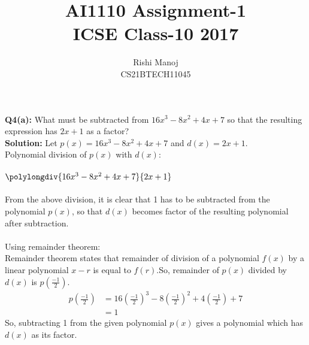 \documentclass[journal,12pt,twocolumn]{IEEEtran}
\title{AI1110 Assignment-1\\ICSE Class-10 2017}
\author{Rishi Manoj\\CS21BTECH11045}
\begin{document}
\maketitle

\providecommand{\brak}[1]{\ensuremath{\left(#1\right)}}

\textbf{Q4(a):}
What must be subtracted from $16x^3-8x^2+4x+7$ so that the resulting expression has $2x+1$ as a factor?\\
\textbf{Solution:}
Let $p(x)=16x^3-8x^2+4x+7$ and $d(x)=2x+1$.\\
Polynomial division of $p(x)$ with $d(x)$:\\
\\
$\polylongdiv{16x^3-8x^2+4x+7}{2x+1}$
\\
\\
From the above division, it is clear that 1 has to be subtracted from the polynomial $p(x)$, so that $d(x)$ becomes factor of the resulting polynomial after subtraction.
\\
\\
Using remainder theorem:\\
Remainder theorem states that remainder of division of a polynomial $f(x)$ by a linear polynomial $x-r$ is equal to $f(r)$.So, remainder of $p(x)$ divided by $d(x)$ is $p\brak{\frac{-1}{2}}$.
\\
\begin{align}
      p\brak{\frac{-1}{2}} &= 16\brak{\frac{-1}{2}}^3-8\brak{\frac{-1}{2}}^2+4\brak{\frac{-1}{2}}+7
      \\
      &= 1
\end{align}
So, subtracting 1 from the given polynomial $p(x)$ gives a polynomial which has $d(x)$ as its factor.
\end{document}

